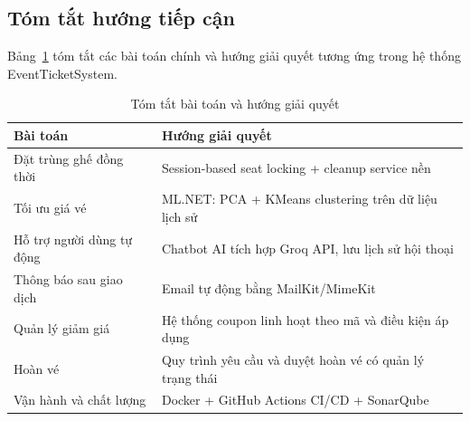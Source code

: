 \documentclass[../main.tex]{subfiles}
\begin{document}
\subsection{Tóm tắt hướng tiếp cận}

Bảng~\ref{tab:approach} tóm tắt các bài toán chính và hướng giải quyết tương ứng trong hệ thống EventTicketSystem.

\begin{table}[h!]
\centering
\caption{Tóm tắt bài toán và hướng giải quyết}
\label{tab:approach}
\begin{tabular}{|p{5cm}|p{9cm}|}
\hline
\textbf{Bài toán} & \textbf{Hướng giải quyết} \\
\hline
Đặt trùng ghế đồng thời & Session-based seat locking + cleanup service nền \\
\hline
Tối ưu giá vé & ML.NET: PCA + KMeans clustering trên dữ liệu lịch sử \\
\hline
Hỗ trợ người dùng tự động & Chatbot AI tích hợp Groq API, lưu lịch sử hội thoại \\
\hline
Thông báo sau giao dịch & Email tự động bằng MailKit/MimeKit \\
\hline
Quản lý giảm giá & Hệ thống coupon linh hoạt theo mã và điều kiện áp dụng \\
\hline
Hoàn vé & Quy trình yêu cầu và duyệt hoàn vé có quản lý trạng thái \\
\hline
Vận hành và chất lượng & Docker + GitHub Actions CI/CD + SonarQube \\
\hline
\end{tabular}
\end{table}
\end{document}
